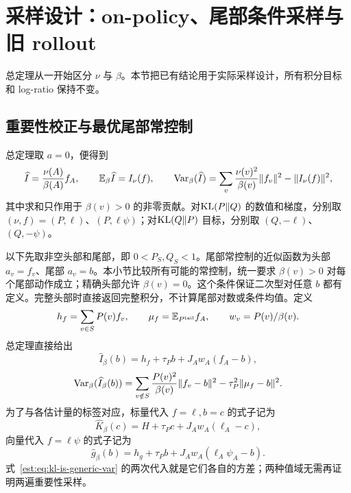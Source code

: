 \section{采样设计：on-policy、尾部条件采样与旧 rollout}
\label{est:sec:kl-sampling}

总定理从一开始区分 $\nu$ 与 $\beta$。本节把已有结论用于实际采样设计，所有积分目标和 log-ratio 保持不变。

\subsection{重要性校正与最优尾部常控制}
\begin{corollary}[直接重要性采样]\label{est:thm:kl-importance}
总定理取 $a=0$，便得到
\begin{equation*}
 \widehat I=\frac{\nu(A)}{\beta(A)}f_A,\qquad
 \mathbb E_\beta\widehat I=I_\nu(f),\qquad
 \operatorname{Var}_\beta(\widehat I)
 =\sum_v\frac{\nu(v)^2}{\beta(v)}\|f_v\|^2-\|I_\nu(f)\|^2,
\end{equation*}
其中求和只作用于 $\beta(v)>0$ 的非零贡献。对$\operatorname{KL}(P\Vert Q)$ 的数值和梯度，分别取 $(\nu,f)=(P,\ell)$、$(P,\ell\psi)$；对$\operatorname{KL}(Q\Vert P)$ 目标，分别取 $(Q,-\ell)$、$(Q,-\psi)$。
\end{corollary}

以下先取非空头部和尾部，即 $0<P_S,Q_S<1$。尾部常控制的近似函数为头部 $a_v=f_v$、尾部 $a_v=b$。本小节比较所有可能的常控制，统一要求 $\beta(v)>0$ 对每个尾部动作成立；精确头部允许 $\beta(v)=0$。这个条件保证二次型对任意 $b$ 都有定义。完整头部时直接返回完整积分，不计算尾部对数或条件均值。定义
\begin{equation*}
 h_f=\sum_{v\in S}P(v)f_v,\qquad
 \mu_f=\mathbb E_{P^{\mathrm{tail}}}f_A,\qquad w_v=P(v)/\beta(v).
\end{equation*}
总定理直接给出
\begin{equation}\label{est:eq:kl-is-generic}
 \widehat I_\beta(b)=h_f+\tau_Pb+J_Aw_A(f_A-b),
\end{equation}
\begin{equation}\label{est:eq:kl-is-generic-var}
 \operatorname{Var}_\beta(\widehat I_\beta(b))
 =\sum_{v\notin S}\frac{P(v)^2}{\beta(v)}\|f_v-b\|^2
   -\tau_P^2\|\mu_f-b\|^2.
\end{equation}
为了与各估计量的标签对应，标量代入 $f=\ell,b=c$ 的式子记为
\begin{equation}\label{est:eq:kl-is-scalar}
 \widehat K_\beta(c)=H+\tau_Pc+J_Aw_A(\ell_A-c),
\end{equation}
向量代入 $f=\ell\psi$ 的式子记为
\begin{equation}\label{est:eq:kl-is-vector}
 \widehat g_\beta(b)=h_g+\tau_Pb+J_Aw_A(\ell_A\psi_A-b).
\end{equation}
式~\eqref{est:eq:kl-is-generic-var} 的两次代入就是它们各自的方差；两种值域无需再证明两遍重要性采样。

